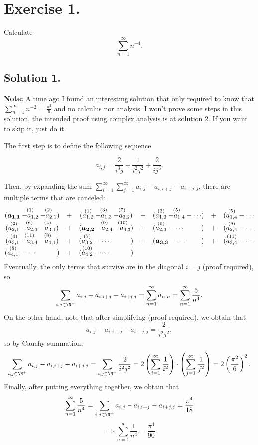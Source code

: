 
\section{Exercise 1.}

Calculate
\[ \sum_{n = 1}^{\infty} n^{-4}. \]

\subsection*{Solution 1.}

\textbf{Note:} A time ago I found an interesting solution that only required to know that $\sum_{n = 1}^{\infty} n^{-2} = \frac{\pi^2}{6}$ and no calculus nor analysis. I won't prove some steps in this solution, the intended proof using complex analysis is at solution 2. If you want to skip it, just do it.

The first step is to define the following sequence

\[ a_{i,j} = \frac{2}{i^3 j} + \frac{1}{i^2 j^2} + \frac{2}{i j^3} .\]

Then, by expanding the sum $\sum_{i = 1}^{\infty} \sum_{j = 1}^{\infty} a_{i,j} - a_{i,i+j} - a_{i+j,j}$, there are multiple terms that are canceled:
\[ \begin{matrix}
    (\boldsymbol{a_{1,1}} \overset{(1)}{- a_{1,2} }\overset{(2)}{- a_{2,1} }) & + & (\overset{(1)}{a_{1,2}} \overset{(3)}{- a_{1,3} }\overset{(7)}{- a_{3,2} }) & + & (\overset{(3)}{a_{1,3} }\overset{(5)}{- a_{1,4}} - \cdots \hfill) & + & (\overset{(5)}{a_{1,4}}-\cdots\\
    (\overset{(2)}{a_{2,1} } \overset{(6)}{- a_{2,3} } \overset{(4)}{- a_{3,1} }) & + & (\boldsymbol{a_{2,2}} \overset{(9)}{- a_{2,4}} \overset{(10)}{-a_{4,2}}) & + & (\overset{(6)}{a_{2,3} }- \cdots \hfill ) & + & (\overset{(9)}{a_{2,4}}-\cdots\\
    (\overset{(4)}{a_{3,1} } \overset{(11)}{- a_{3,4}} \overset{(8)}{- a_{4,1}}) & + & (\overset{(7)}{a_{3,2} } - \cdots \hfill ) & + & (\boldsymbol{a_{3,3}} - \cdots \hfill ) & + & (\overset{(11)}{a_{3,4}}-\cdots\\
    (\overset{(8)}{a_{4,1}} - \cdots \hfill ) & + & (\overset{(10)}{a_{4,2}} - \cdots \hfill )
\end{matrix} \]
Eventually, the only terms that survive are in the diagonal $i = j$ (proof required), so 
\[ \sum_{i,j \in \N^+} a_{i,j} - a_{i,i+j} - a_{i+j,j} = \sum_{n = 1}^{\infty} a_{n,n} = \sum_{n = 1}^{\infty} \frac{5}{n^4}. \]
On the other hand, note that after simplifying (proof required), we obtain that
\[ a_{i,j} - a_{i,i+j} - a_{i+j,j} = \frac{2}{i^2 j^2}, \]
so by Cauchy summation,
\[ \sum_{i,j \in \N^+} a_{i,j} - a_{i,i+j} - a_{i+j,j} = \sum_{i,j \in \N^+} \frac{2}{i^2 j^2} = 2 \left( \sum_{i = 1}^{\infty} \frac{1}{i^2} \right)\cdot\left( \sum_{j = 1}^{\infty} \frac{1}{j^2} \right) = 2\left( \frac{\pi^2}{6} \right)^2. \]
Finally, after putting everything together, we obtain that
\[ \sum_{n = 1}^{\infty} \frac{5}{n^4} = \sum_{i,j \in \N^+} a_{i,j} - a_{i,i+j} - a_{i+j,j} = \frac{\pi^4}{18} \]
\[ \implies \sum_{n = 1}^{\infty} \frac{1}{n^4} =  \frac{\pi^4}{90}.\]

